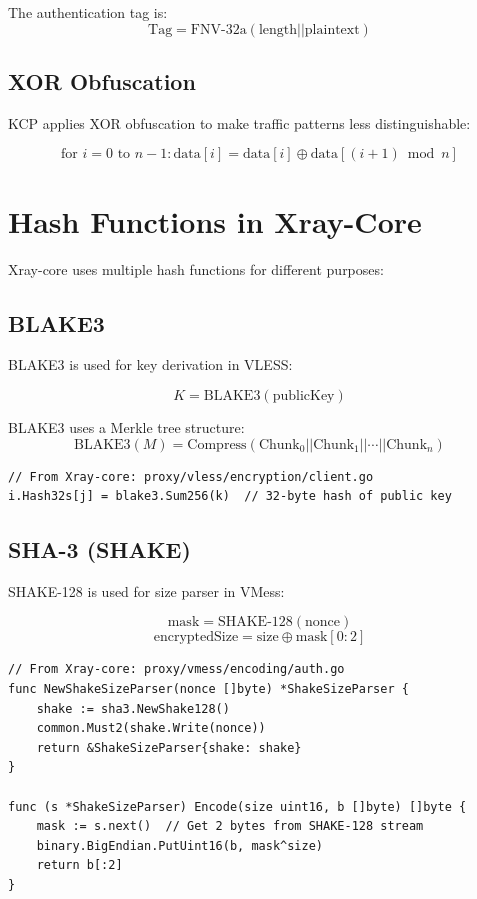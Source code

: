 The authentication tag is:
\[
\text{Tag} = \text{FNV-32a}(\text{length} || \text{plaintext})
\]

\subsection{XOR Obfuscation}

KCP applies XOR obfuscation to make traffic patterns less distinguishable:

\[
\text{for } i = 0 \text{ to } n-1: \text{data}[i] = \text{data}[i] \oplus \text{data}[(i+1) \bmod n]
\]

\section{Hash Functions in Xray-Core}

Xray-core uses multiple hash functions for different purposes:

\subsection{BLAKE3}

BLAKE3 is used for key derivation in VLESS:

\[
K = \text{BLAKE3}(\text{publicKey})
\]

BLAKE3 uses a Merkle tree structure:
\[
\text{BLAKE3}(M) = \text{Compress}(\text{Chunk}_0 || \text{Chunk}_1 || \cdots || \text{Chunk}_n)
\]

\begin{verbatim}
// From Xray-core: proxy/vless/encryption/client.go
i.Hash32s[j] = blake3.Sum256(k)  // 32-byte hash of public key
\end{verbatim}

\subsection{SHA-3 (SHAKE)}

SHAKE-128 is used for size parser in VMess:

\[
\text{mask} = \text{SHAKE-128}(\text{nonce})
\]
\[
\text{encryptedSize} = \text{size} \oplus \text{mask}[0:2]
\]

\begin{verbatim}
// From Xray-core: proxy/vmess/encoding/auth.go
func NewShakeSizeParser(nonce []byte) *ShakeSizeParser {
    shake := sha3.NewShake128()
    common.Must2(shake.Write(nonce))
    return &ShakeSizeParser{shake: shake}
}

func (s *ShakeSizeParser) Encode(size uint16, b []byte) []byte {
    mask := s.next()  // Get 2 bytes from SHAKE-128 stream
    binary.BigEndian.PutUint16(b, mask^size)
    return b[:2]
}
\end{verbatim}

